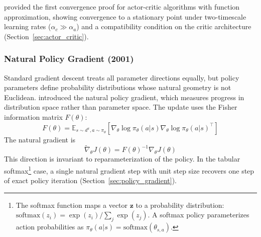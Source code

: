 \citet{konda2000} provided the first convergence proof for actor-critic algorithms with function approximation, showing convergence to a stationary point under two-timescale learning rates ($\alpha_c \gg \alpha_a$) and a compatibility condition on the critic architecture (Section~\ref{sec:actor_critic}).


\subsubsection{Natural Policy Gradient (2001)}

Standard gradient descent treats all parameter directions equally, but policy parameters define probability distributions whose natural geometry is not Euclidean. \citet{Kakade2001} introduced the natural policy gradient, which measures progress in distribution space rather than parameter space. The update uses the Fisher information matrix $F(\theta)$:
\begin{equation}
F(\theta) = \mathbb{E}_{s \sim d^\pi, a \sim \pi_\theta} \left[ \nabla_\theta \log \pi_\theta(a|s) \nabla_\theta \log \pi_\theta(a|s)^\top \right]
\end{equation}
The natural gradient is
\begin{equation}
\tilde{\nabla}_\theta J(\theta) = F(\theta)^{-1} \nabla_\theta J(\theta)
\end{equation}
This direction is invariant to reparameterization of the policy. In the tabular softmax\footnote{The softmax function maps a vector $\mathbf{z}$ to a probability distribution: $\text{softmax}(z_i) = \exp(z_i)/\sum_j \exp(z_j)$. A softmax policy parameterizes action probabilities as $\pi_\theta(a|s) = \text{softmax}(\theta_{s,a})$.} case, a single natural gradient step with unit step size recovers one step of exact policy iteration (Section~\ref{sec:policy_gradient}).

